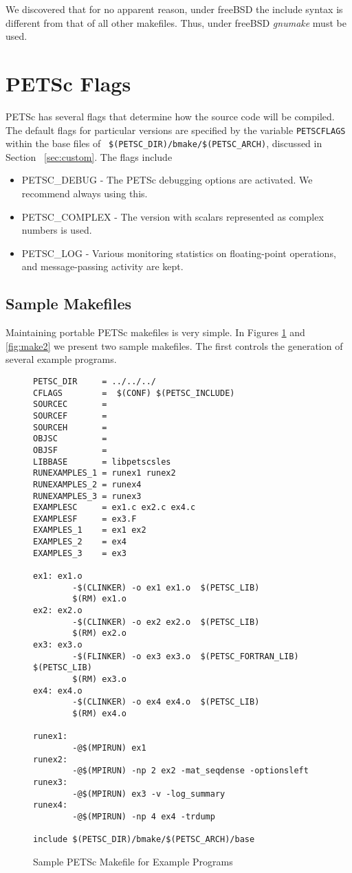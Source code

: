 We discovered that for no apparent reason, under freeBSD the include 
syntax is different from that of all other makefiles. Thus, under 
freeBSD {\em gnumake} must be used.

\section{PETSc Flags}
\label{sec:makeflags}

PETSc has several flags that determine how the source code will be
compiled.  The default flags for particular versions are specified by
the variable {\tt PETSCFLAGS} within the base files of {\tt
\$(PETSC\_DIR)/bmake/\$(PETSC\_ARCH)}, discussed in Section
~\ref{sec:custom}.  The flags include
\begin{itemize}
\item PETSC\_DEBUG - The PETSc debugging options are activated. We 
      recommend always using this. 
\item PETSC\_COMPLEX - The version with scalars represented 
      as complex numbers is used. 
\item PETSC\_LOG - Various monitoring statistics on floating-point operations,
      and message-passing activity are kept. 
\end{itemize}

\subsection{Sample Makefiles}

Maintaining portable PETSc makefiles is very simple. In Figures
\ref{fig:make1} and \ref{fig:make2} we present two sample makefiles. 
The first controls the generation of several example programs. 

\begin{figure}[H]
{\small
\begin{verbatim}
PETSC_DIR     = ../../../
CFLAGS        =  $(CONF) $(PETSC_INCLUDE)
SOURCEC       = 
SOURCEF       =
SOURCEH       =
OBJSC         =
OBJSF         =
LIBBASE       = libpetscsles
RUNEXAMPLES_1 = runex1 runex2
RUNEXAMPLES_2 = runex4
RUNEXAMPLES_3 = runex3
EXAMPLESC     = ex1.c ex2.c ex4.c
EXAMPLESF     = ex3.F
EXAMPLES_1    = ex1 ex2
EXAMPLES_2    = ex4
EXAMPLES_3    = ex3

ex1: ex1.o 
        -$(CLINKER) -o ex1 ex1.o  $(PETSC_LIB)
        $(RM) ex1.o
ex2: ex2.o 
        -$(CLINKER) -o ex2 ex2.o  $(PETSC_LIB)
        $(RM) ex2.o
ex3: ex3.o 
        -$(FLINKER) -o ex3 ex3.o  $(PETSC_FORTRAN_LIB) $(PETSC_LIB)
        $(RM) ex3.o
ex4: ex4.o 
        -$(CLINKER) -o ex4 ex4.o  $(PETSC_LIB)
        $(RM) ex4.o

runex1:
        -@$(MPIRUN) ex1
runex2:
        -@$(MPIRUN) -np 2 ex2 -mat_seqdense -optionsleft
runex3:
        -@$(MPIRUN) ex3 -v -log_summary
runex4:
        -@$(MPIRUN) -np 4 ex4 -trdump

include $(PETSC_DIR)/bmake/$(PETSC_ARCH)/base
\end{verbatim}
}
\caption{Sample PETSc Makefile for Example Programs}
\label{fig:make1}
\end{figure}

